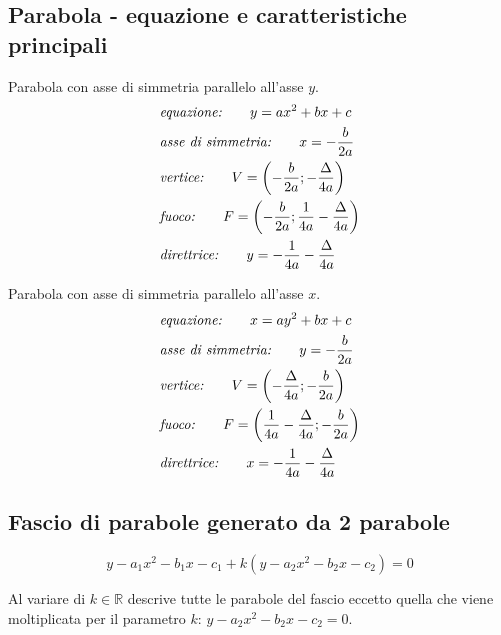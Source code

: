 \documentclass{article}
\begin{document}
  \subsection*{Parabola - equazione e caratteristiche principali}
  \begin{minipage}[t]{.45\textwidth}
    Parabola con asse di simmetria parallelo all'asse $y$.
    \begin{align}
      & \text{\textit{equazione:}} \qquad
      y = ax^2 + bx + c \\
      & \text{\textit{asse di simmetria:}} \qquad
      x = -\frac{b}{2a} \\
      & \text{\textit{vertice:}} \qquad
      V = \left(-\frac{b}{2a}; -\frac{\Delta}{4a}\right) \\
      & \text{\textit{fuoco:}} \qquad
      F = \left(-\frac{b}{2a}; \frac{1}{4a} -\frac{\Delta}{4a}\right) \\
      & \text{\textit{direttrice:}} \qquad
      y = -\frac{1}{4a} -\frac{\Delta}{4a}
    \end{align}
  \end{minipage}
  \hfill
  \begin{minipage}[t]{.45\textwidth}
    Parabola con asse di simmetria parallelo all'asse $x$.
    \begin{align}
      & \text{\textit{equazione:}} \qquad
      x = ay^2 + bx + c \\
      & \text{\textit{asse di simmetria:}} \qquad
      y = -\frac{b}{2a} \\
      & \text{\textit{vertice:}} \qquad
      V = \left(-\frac{\Delta}{4a}; -\frac{b}{2a}\right) \\
      & \text{\textit{fuoco:}} \qquad
      F = \left(\frac{1}{4a} -\frac{\Delta}{4a}; -\frac{b}{2a}\right) \\
      & \text{\textit{direttrice:}} \qquad
      x = -\frac{1}{4a} -\frac{\Delta}{4a}
    \end{align}
  \end{minipage}

  \subsection*{Fascio di parabole generato da 2 parabole}
  \begin{equation}
    y -a_1x^2 -b_1x -c_1 +k(y -a_2x^2 -b_2x -c_2) = 0
  \end{equation}

  Al variare di $k \in \mathbb{R}$ descrive tutte le parabole del fascio eccetto quella che viene moltiplicata per il parametro $k$: $y - a_2x^2 -b_2x -c_2 = 0$.
\end{document}
